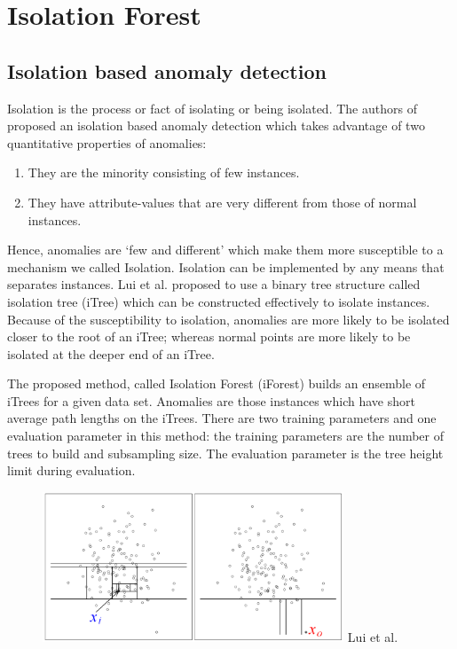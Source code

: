 \chapter{Isolation Forest}
\label{ch:isolation-forest}

\section{Isolation based anomaly detection}
\label{sec:isolation-based-anomaly-detection}

Isolation is the process or fact of isolating or being isolated.
The authors of \cite{10.1145/2133360.2133363} proposed an isolation based anomaly detection which takes advantage of two quantitative properties of anomalies:
\begin{enumerate}
    \item They are the minority consisting of few instances.
    \item They have attribute-values that are very different from those of normal instances.
\end{enumerate}

Hence, anomalies are `few and different' which make them more susceptible to a mechanism we called Isolation.
Isolation can be implemented by any means that separates instances.
Lui et al. \cite{10.1145/2133360.2133363} proposed to use a binary tree structure called isolation tree (iTree) which can be constructed effectively to isolate instances.
Because of the susceptibility to isolation, anomalies are more likely to be isolated closer to the root of an iTree;
whereas normal points are more likely to be isolated at the deeper end of an iTree.

The proposed method, called Isolation Forest (iForest) builds an ensemble of iTrees for a given data set.
Anomalies are those instances which have short average path lengths on the iTrees.
There are two training parameters and one evaluation parameter in this method: the training parameters are the number of trees to build and subsampling size.
The evaluation parameter is the tree height limit during evaluation.

\vspace{1em}
\begin{figure}[!ht]
    \label{fig:isolating-a-point}
    \centering
    \includegraphics[width=0.80\textwidth]{../fig/chapter2/isolating-a-point.png}
    {Lui et al. \cite{10.1145/2133360.2133363}}
\end{figure}


